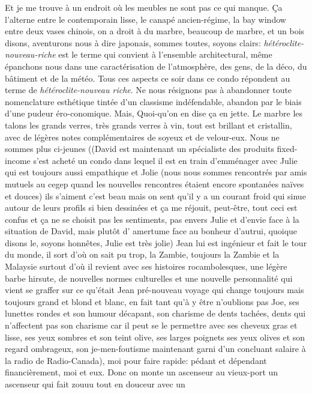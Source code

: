 Et je me trouve à un endroit où les meubles ne sont pas ce qui manque.  Ça
l'alterne entre le contemporain lisse, le canapé ancien-régime, la bay window
entre deux vases chinois, on a droit à du marbre, beaucoup de marbre, et un bois
disons, aventurons nous à dire japonais, sommes toutes, soyons clairs:
\emph{hétéroclite-nouveau-riche} est le terme qui convient à l'ensemble
architectural, même épanchons nous dans une caractérisation de l'atmosphère, des
gens, de la déco, du bâtiment et de la météo. Tous ces aspects ce soir dans ce
condo répondent au terme de \emph{hétéroclite-nouveau riche}. Ne nous résignons
pas à abandonner toute nomenclature esthétique tintée d'un  classisme
indéfendable, abandon par le biais d'une pudeur éro-conomique. Mais, Quoi-qu'on
en dise ça en jette. Le marbre les talons les grands verres, très grands verres
à vin, tout est brillant et cristallin, avec de légères notes complémentaires 
de soyeux et de velour-eux. Nous ne sommes plus ci-jeunes ((David est
maintenant un spécialiste des produits fixed-income s'est acheté un condo dans
lequel il est en train d'emménager avec Julie qui est toujours aussi empathique
et Jolie (nous nous sommes rencontrés par amis mutuels au cegep quand les
nouvelles rencontres étaient encore spontanées naïves et douces) ils s'aiment
c'est beau mais on sent qu'il y a un courant froid qui sinue autour de leurs
profils si bien dessinées et ça me réjouit, peut-être, tout ceci est confus et ça
ne se choisit pas les sentiments, pas envers Julie et d'envie face à la
situation de David, mais plutôt d' amertume face au bonheur d'autrui, quoique
disons le, soyons honnêtes,  Julie est très jolie) Jean lui est ingénieur et
fait le tour du monde, il sort d'où on sait pu trop, la Zambie, toujours la
Zambie et la Malaysie surtout d'où il revient avec ses histoires rocambolesques,
une légère barbe hirsute, de nouvelles normes culturelles et une nouvelle
personnalité qui vient se graffer sur ce qu'était Jean pré-nouveau voyage qui
change toujours mais toujours grand et blond et blanc, en fait tant qu'à y être
n'oublions pas Joe, ses lunettes rondes et son humour décapant, son charisme de
dents tachées, dents qui n'affectent pas son charisme car il peut se le
permettre avec ses cheveux gras et lisse, ses yeux sombres et son teint olive,
ses larges poignets ses yeux olives et son regard ombrageux, son je-men-foutisme
maintenant garni d'un concluant salaire à la radio de Radio-Canada), moi pour
faire rapide: pédant et dépendant financièrement, moi et eux. Donc on monte un
ascenseur au vieux-port un ascenseur qui fait zouuu tout en douceur avec un
